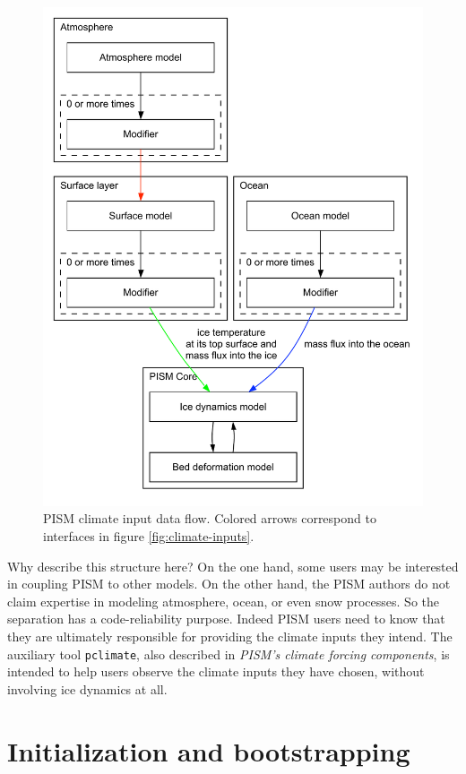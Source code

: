 \documentclass[titlepage,letterpaper,final]{scrartcl}
\begin{document}
\begin{figure}
  \centering
  \includegraphics[width=5in]{figs/data-flow.pdf}
  \caption{PISM climate input data flow. Colored arrows correspond to interfaces in
    figure \ref{fig:climate-inputs}.}
  \label{fig:climate-input-data-flow}
\end{figure}

Why describe this structure here? On the one hand, some users may be interested
in coupling PISM to other models. On the other hand, the PISM authors do not
claim expertise in modeling atmosphere, ocean, or even snow processes.   So the
separation has a code-reliability purpose. Indeed PISM users need to know that
they are ultimately responsible for providing the climate inputs they intend.
The auxiliary tool \texttt{pclimate}, also described in \emph{PISM's climate
  forcing components}, is intended to help users observe the climate inputs
they have chosen, without involving ice dynamics at all.

\clearpage
\newpage
\section{Initialization and bootstrapping}
\label{sect:boot}
\end{document}
